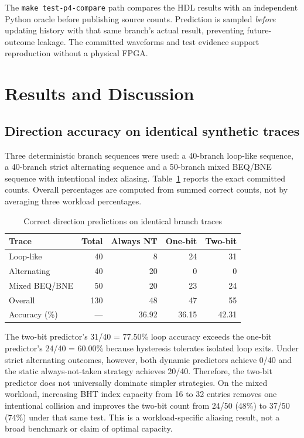 \documentclass[conference,a4paper]{IEEEtran}
\begin{document}
The \texttt{make test-p4-compare} path compares the HDL results with an independent Python oracle before publishing source counts. Prediction is sampled \emph{before} updating history with that same branch's actual result, preventing future-outcome leakage. The committed waveforms and test evidence support reproduction without a physical FPGA.

\section{Results and Discussion}
\subsection{Direction accuracy on identical synthetic traces}
Three deterministic branch sequences were used: a 40-branch loop-like sequence, a 40-branch strict alternating sequence and a 50-branch mixed BEQ/BNE sequence with intentional index aliasing. Table~\ref{tab:accuracy} reports the exact committed counts. Overall percentages are computed from summed correct counts, not by averaging three workload percentages.

\begin{table}[t]
\caption{Correct direction predictions on identical branch traces}
\label{tab:accuracy}
\centering
\begin{tabular}{@{}lrrrr@{}}
\toprule
Trace & Total & Always NT & One-bit & Two-bit \\
\midrule
Loop-like & 40 & 8 & 24 & 31 \\
Alternating & 40 & 20 & 0 & 0 \\
Mixed BEQ/BNE & 50 & 20 & 23 & 24 \\
\midrule
Overall & 130 & 48 & 47 & 55 \\
Accuracy (\%) & --- & 36.92 & 36.15 & 42.31 \\
\bottomrule
\end{tabular}
\end{table}

The two-bit predictor's 31/40 = 77.50\% loop accuracy exceeds the one-bit predictor's 24/40 = 60.00\% because hysteresis tolerates isolated loop exits. Under strict alternating outcomes, however, both dynamic predictors achieve 0/40 and the static always-not-taken strategy achieves 20/40. Therefore, the two-bit predictor does not universally dominate simpler strategies. On the mixed workload, increasing BHT index capacity from 16 to 32 entries removes one intentional collision and improves the two-bit count from 24/50 (48\%) to 37/50 (74\%) under that same test. This is a workload-specific aliasing result, not a broad benchmark or claim of optimal capacity.
\end{document}

